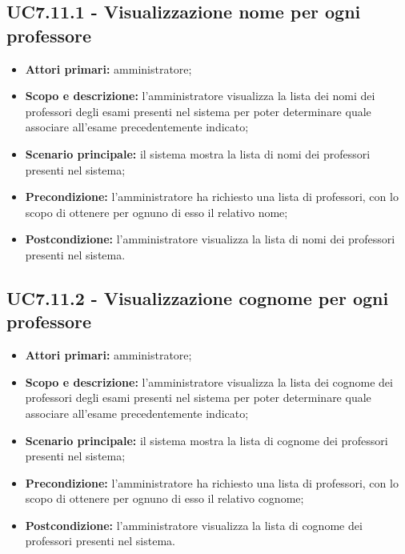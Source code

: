 \documentclass[AnalisiDeiRequisiti.tex]{subfiles}
\begin{document}
\subsection{UC7.11.1 - Visualizzazione nome per ogni professore}
\begin{itemize}
	\item \textbf{Attori primari:} amministratore;
	\item \textbf{Scopo e descrizione:} l'amministratore visualizza la lista dei nomi dei professori degli esami presenti nel sistema per poter determinare quale associare all'esame precedentemente indicato;
	\item \textbf{Scenario principale:} il sistema mostra la lista di nomi dei professori presenti nel sistema;
	\item \textbf{Precondizione:} l'amministratore ha richiesto una lista di professori, con lo scopo di ottenere per ognuno di esso il relativo nome; 
	\item \textbf{Postcondizione:} l'amministratore visualizza la lista di nomi dei professori presenti nel sistema.
\end{itemize}
\subsection{UC7.11.2 - Visualizzazione cognome per ogni professore}
\begin{itemize}
	\item \textbf{Attori primari:} amministratore;
	\item \textbf{Scopo e descrizione:} l'amministratore visualizza la lista dei cognome dei professori degli esami presenti nel sistema per poter determinare quale associare all'esame precedentemente indicato;
	\item \textbf{Scenario principale:} il sistema mostra la lista di cognome dei professori presenti nel sistema;
	\item \textbf{Precondizione:} l'amministratore ha richiesto una lista di professori, con lo scopo di ottenere per ognuno di esso il relativo cognome; 
	\item \textbf{Postcondizione:} l'amministratore visualizza la lista di cognome dei professori presenti nel sistema.
\end{itemize}
\end{document}
